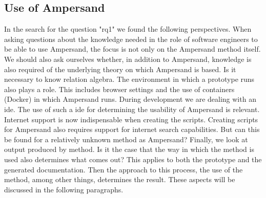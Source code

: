 \subsection{Use of Ampersand}\label{use_of_ampersand}
In the search for the question "\acrlong{rq1}" we found the following perspectives.
When asking questions about the knowledge needed in the role of software engineers to be able to use Ampersand, the focus is not only on the Ampersand method itself.
We should also ask ourselves whether, in addition to Ampersand, knowledge is also required of the underlying theory on which Ampersand is based.
Is it necessary to know relation algebra.
The environment in which a prototype runs also plays a role.
This includes browser settings and the use of containers (Docker) in which Ampersand runs.
During development we are dealing with an \acrfull{ide}.
The use of such a \acrshort{ide} for determining the usability of Ampersand is relevant.
Internet support is now indispensable when creating the scripts.
Creating scripts for Ampersand also requires support for internet search capabilities.
But can this be found for a relatively unknown method as Ampersand?
Finally, we look at output produced by method.
Is it the case that the way in which the method is used also determines what comes out?
This applies to both the prototype and the generated documentation.
Then the approach to this process, the use of the method, among other things, determines the result.
These aspects will be discussed in the following paragraphs.

